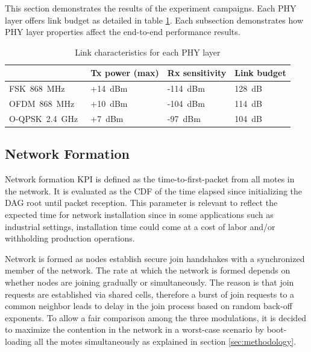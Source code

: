 \documentclass[journal]{IEEEtran}
\newcommand{\fsk}          {FSK~868~MHz}
\newcommand{\oqpsk}        {O-QPSK~2.4~GHz}
\newcommand{\ofdm}         {OFDM~868~MHz}
\begin{document}
This section demonstrates the results of the experiment campaigns.
Each PHY layer offers link budget as detailed in table \ref{tab:linkbudget}. 
Each subsection demonstrates how PHY layer properties affect the end-to-end performance results. 

\begin{table}[t]
\centering
\caption{Link characteristics for each PHY layer}
\begin{tabular}{|l|l|l|l|}
\hline
        &  Tx power (max) & Rx sensitivity & Link budget \\ \hline
\fsk\   & +14~dBm      & -114~dBm             & 128~dB      \\ \hline
\ofdm\  & +10~dBm      & -104~dBm             & 114~dB      \\ \hline
\oqpsk\ & +7~dBm       & -97~dBm              & 104~dB      \\ \hline
\end{tabular}
\label{tab:linkbudget}
\end{table}

\subsection{Network Formation}
\label{sec:network_formation}


Network formation KPI is defined as the time-to-first-packet  from all motes in the network.
It is evaluated as the CDF of the time elapsed since initializing the DAG root until packet reception. 
This parameter is relevant to reflect the expected time for network installation since in some applications such as industrial settings, installation time could come at a cost of labor and/or withholding production operations.


Network is formed as nodes establish secure join handshakes with a synchronized member of the network.
The rate at which the network is formed depends on whether nodes are joining gradually or  simultaneously.
The reason is that join requests are established via shared cells, therefore a burst of join requests to a common neighbor leads to delay in the join process based on random back-off exponents. 
To allow a fair comparison among the three modulations, it is decided to maximize the contention in the network in a worst-case scenario by boot-loading all the motes simultaneously as explained in section \ref{sec:methodology}.
\end{document}
